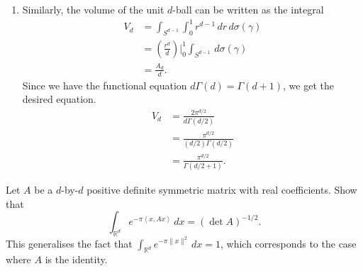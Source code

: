 \documentclass[12 pt, letterpaper]{hmcpset}
\begin{document}
\begin{solution}
\begin{enumerate}
		\item Similarly, the volume of the unit $d$-ball can be written as the integral
			 \begin{align*}
				 V_{d} & = \int_{S^{d - 1}} \int_{0}^{1} r^{d - 1}  \, dr  \, d\sigma(\gamma) \\
				       & = \left ( \frac{r^{d}}{d} \right ) \Big |_{0}^{1} \int_{S^{d - 1}} \, d\sigma(\gamma) \\
				       & = \frac{A_{d}}{d}.
			\end{align*}
			Since we have the functional equation $d \Gamma(d) = \Gamma(d + 1)$, we get the desired equation.
			\begin{align*}
				V_{d} & = \frac{2 \pi^{d / 2}}{d \Gamma(d  / 2)} \\
				      & = \frac{\pi^{d / 2}}{(d / 2) \Gamma(d / 2)} \\
				      & = \frac{\pi^{d / 2}}{\Gamma(d / 2 + 1)}.
			\end{align*}
	\end{enumerate}
\end{solution}

\pagebreak

\begin{problem}[S \& S  \S 6.6 \#5]
	Let $A$ be a $d$-by-$d$ positive definite symmetric matrix with real coefficients. Show that
	\[
		\int_{\mathbb{R}^{d}} e^{-\pi \left < x, Ax \right >} \, dx = (\det A)^{-1/2}.
	\]
	This generalises the fact that $\int_{\mathbb{R}^{d}} e^{-\pi \lVert x \rVert^{2}} \, dx = 1$, which corresponds to the case where $A$ is the identity.
\end{problem}
\end{document}
